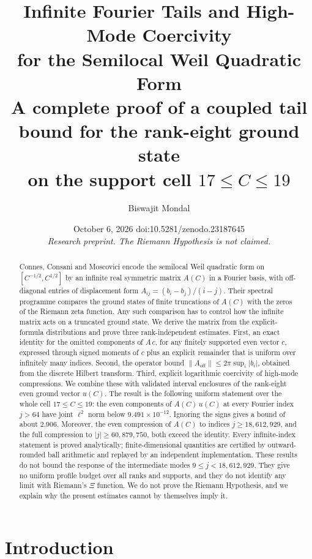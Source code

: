 \documentclass[11pt,a4paper]{article}
\title{\bfseries\Large Infinite Fourier Tails and High-Mode Coercivity\\ for the Semilocal Weil Quadratic Form\\[0.35em]
\large A complete proof of a coupled tail bound for the rank-eight ground state\\ on the support cell $17\le C\le 19$}
\author{Biswajit Mondal}
\date{\small October 6, 2026 \quad doi:10.5281/zenodo.23187645\\[0.25em]
\textit{Research preprint. The Riemann Hypothesis is not claimed.}}
\theoremstyle{definition}
\newcommand{\norm}[1]{\lVert #1\rVert}
\newcommand{\abs}[1]{\lvert #1\rvert}
\begin{document}
\maketitle

\begin{abstract}
Connes, Consani and Moscovici encode the semilocal Weil quadratic form on
$[C^{-1/2},C^{1/2}]$ by an infinite real symmetric matrix $A(C)$ in a
Fourier basis, with off-diagonal entries of displacement form
$A_{ij}=(b_i-b_j)/(i-j)$. Their spectral programme compares the ground
states of finite truncations of $A(C)$ with the zeros of the Riemann zeta
function. Any such comparison has to control how the infinite matrix acts on
a truncated ground state. We derive the matrix from the explicit-formula
distributions and prove three rank-independent estimates. First, an exact
identity for the omitted components of $A\,c$, for any finitely supported
even vector $c$, expressed through signed moments of $c$ plus an explicit
remainder that is uniform over infinitely many indices. Second, the operator
bound $\norm{A_{\mathrm{off}}}\le 2\pi\sup_i\abs{b_i}$, obtained from the
discrete Hilbert transform. Third, explicit logarithmic coercivity of
high-mode compressions. We combine these with validated interval
enclosures of the rank-eight even ground vector $u(C)$. The result is the
following uniform statement over the whole cell $17\le C\le 19$: the
even components of $A(C)\,u(C)$ at every Fourier index $j>64$ have joint
$\ell^2$ norm below $9.491\times 10^{-12}$. Ignoring the signs gives a
bound of about $2.906$. Moreover, the even compression of $A(C)$ to
indices $j\ge 18{,}612{,}929$, and the full compression to
$\abs{j}\ge 60{,}879{,}750$, both exceed the identity. Every
infinite-index statement is proved analytically; finite-dimensional
quantities are certified by outward-rounded ball arithmetic and replayed
by an independent implementation. These results do not bound the response
of the intermediate modes $9\le j<18{,}612{,}929$. They give no uniform
profile budget over all ranks and supports, and they do not identify any
limit with Riemann's $\Xi$ function. We do not prove the Riemann Hypothesis,
and we explain why the present estimates cannot by themselves imply it.
\end{abstract}

\tableofcontents

\section{Introduction}\label{sec:intro}
\end{document}
